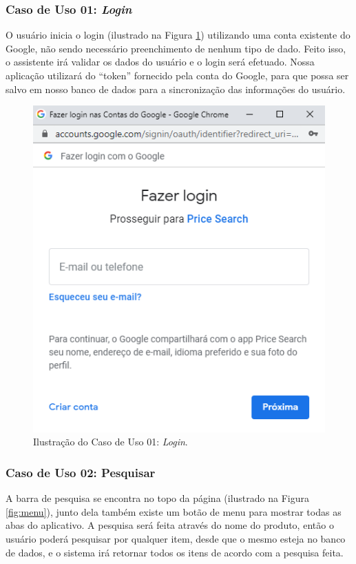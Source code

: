 \subsubsection{Caso de Uso 01: \textit{Login}}

O usuário inicia o login (ilustrado na Figura  \ref{fig:login}) utilizando uma conta existente do Google, não sendo necessário preenchimento de nenhum tipo de dado. Feito isso, o assistente irá validar os dados do usuário e o login será efetuado. Nossa aplicação utilizará do ``token'' fornecido pela conta do Google, para que possa ser salvo em nosso banco de dados para a sincronização das informações do usuário.

\begin{figure}[H]
\centering
\includegraphics[width=\linewidth]{figuras/tela-login.png}
\caption{Ilustração do Caso de Uso 01: \textit{Login}.}
\label{fig:login}
\end{figure}

\subsubsection{Caso de Uso 02: Pesquisar}

A barra de pesquisa se encontra no topo da página (ilustrado na Figura  \ref{fig:menu}), junto dela também existe um botão de menu para mostrar todas as abas do aplicativo. A pesquisa será feita através do nome do produto, então o usuário poderá pesquisar por qualquer item, desde que o mesmo esteja no banco de dados, e o sistema irá retornar todos os itens de acordo com a pesquisa feita.

